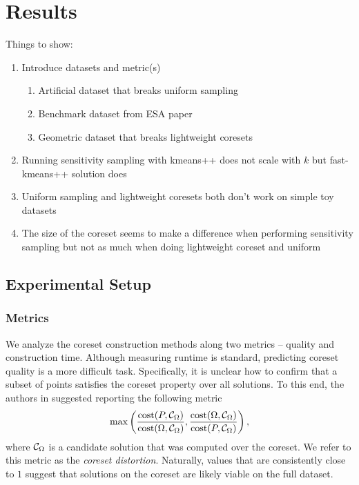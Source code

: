 \section{Results}
Things to show:
\begin{enumerate}
    \item Introduce datasets and metric(s)
    \begin{enumerate}
        \item Artificial dataset that breaks uniform sampling
        \item Benchmark dataset from ESA paper
        \item Geometric dataset that breaks lightweight coresets
    \end{enumerate}
    \item Running sensitivity sampling with kmeans++ does not scale with $k$ but fast-kmeans++ solution does
    \item Uniform sampling and lightweight coresets both don't work on simple toy datasets
    \item The size of the coreset seems to make a difference when performing sensitivity sampling but not as much
          when doing lightweight coreset and uniform
\end{enumerate}

\subsection{Experimental Setup}
\subsubsection{Metrics}

We analyze the coreset construction methods along two metrics -- quality and construction time.  Although measuring runtime is standard, predicting coreset
quality is a more difficult task. Specifically, it is unclear how to confirm that a subset of points satisfies the coreset property over all solutions. To this
end, the authors in \cite{chrisESA} suggested reporting the following metric 
\[ \max \left( \dfrac{\operatorname{cost}(P, \mathcal C_{\Omega})}{\operatorname{cost}(\Omega, \mathcal C_{\Omega})}, \dfrac{\operatorname{cost}(\Omega, \mathcal C_{\Omega})}{\operatorname{cost}(P, \mathcal C_{\Omega})} \right),\]
where $\mathcal C_{\Omega}$ is a candidate solution that was computed over the coreset.
We refer to this metric as the \emph{coreset distortion}. Naturally, values that are consistently close to $1$ suggest that solutions on the coreset are likely
viable on the full dataset.


